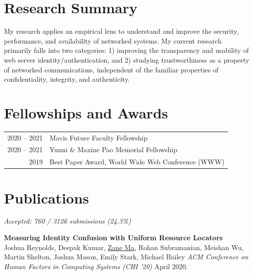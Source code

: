 \documentclass[10pt,singlecolumn]{article} %
\begin{document}
\section{Research Summary} 

My research applies an empirical lens to understand and improve the security,
performance, and availability of networked systems. My current research primarily falls into 
two categories: 1) improving the transparency and usability of web server identity/authentication, and 2) 
studying trustworthiness as a property of networked communications, independent
of the familiar properties of confidentiality, integrity, and authenticity. \\


\section{Fellowships and Awards} 

\begin{tabular}{rl}

2020 -- 2021 & Mavis Future Faculty Fellowship \\

2020 -- 2021 & Yunni \& Maxine Pao Memorial Fellowship \\

2019 & Best Paper Award, World Wide Web Conference (WWW) \\
\end{tabular}

\section{Publications} 


\vspace{6pt}

{\raggedleft\textit{Accepted: 760 / 3126 submissions (24.3\%)}\par}

\textbf{Measuring Identity Confusion with Uniform Resource Locators}\\
Joshua Reynolds, Deepak Kumar, \underline{Zane Ma}, Rohan Subramanian, Meishan Wu, Martin Shelton, Joshua Mason, Emily Stark, Michael Bailey
\textit{ACM Conference on Human Factors in Computing Systems (CHI '20)} April 2020.
\end{document}
